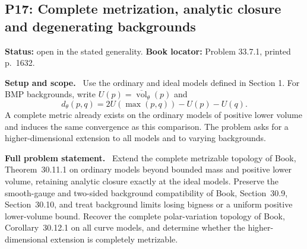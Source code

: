 \documentclass[11pt]{article}
\newcommand{\field}[1]{\par\medskip\noindent\textbf{#1.}\ }
\begin{document}
\subsection{P17: Complete metrization, analytic closure and degenerating backgrounds}
\label{P17}
\noindent\textbf{Status:} open in the stated generality. \textbf{Book locator:} Problem 33.7.1, printed p.~1632.
\field{Setup and scope} Use the ordinary and ideal models defined in Section 1. For BMP backgrounds, write $U(p)=\overline{\operatorname{vol}}_\theta(p)$ and
\[d_\theta(p,q)=2U(\max(p,q))-U(p)-U(q).\]
A complete metric already exists on the ordinary models of positive lower volume and induces the same convergence as this comparison. The problem asks for a higher-dimensional extension to all models and to varying backgrounds.
\field{Full problem statement} Extend the complete metrizable topology of Book, Theorem~30.11.1 on ordinary models beyond bounded mass and positive lower volume, retaining analytic closure exactly at the ideal models. Preserve the smooth-gauge and two-sided background compatibility of Book, Section~30.9, Section~30.10, and treat background limits losing bigness or a uniform positive lower-volume bound. Recover the complete polar-variation topology of Book, Corollary~30.12.1 on all curve models, and determine whether the higher-dimensional extension is completely metrizable.
\end{document}
